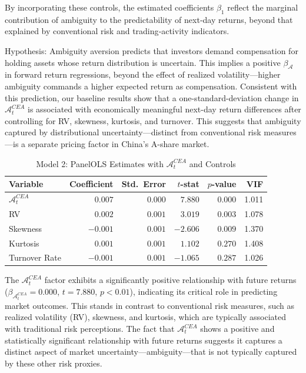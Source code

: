 \documentclass[preprint,12pt,authoryear]{elsarticle}
\renewcommand{\textcolor}[2]{\begingroup\color{#1}#2\endgroup}
\begin{document}
By incorporating these controls, the estimated coefficients \(\beta_1\) reflect the marginal contribution of ambiguity to the predictability of next‐day returns, beyond that explained by conventional risk and trading‐activity indicators.

\textcolor{red}{Hypothesis: Ambiguity aversion predicts that investors demand compensation for holding assets whose return distribution is uncertain. This implies a positive $\beta_{\mathcal{A}}$ in forward return regressions, beyond the effect of realized volatility---higher ambiguity commands a higher expected return as compensation. Consistent with this prediction, our baseline results show that a one-standard-deviation change in $\mathcal{A}^{CEA}_t$ is associated with economically meaningful next-day return differences after controlling for RV, skewness, kurtosis, and turnover. This suggests that ambiguity captured by distributional uncertainty---distinct from conventional risk measures---is a separate pricing factor in China's A-share market.}

\begin{table}[h!]
  \centering
\caption{Model 2: PanelOLS Estimates with \(\mathcal{A}^{CEA}_t\) and Controls}
  \label{tab:panelols_model2}
  \begin{tabularx}{\textwidth}{Xrrrrr}
    \toprule
    Variable         & Coefficient & Std.\ Error & \(t\)-stat & \(p\)-value & VIF    \\
    \midrule
    \(\mathcal{A}^{CEA}_t\) & \(0.007\)   & \(0.000\)   & \(7.880\)   & \(0.000\)   & 1.011  \\
    RV               & \(0.002\)   & \(0.001\)   & \(3.019\)   & \(0.003\)   & 1.078  \\
    Skewness         & \(-0.001\)  & \(0.001\)   & \(-2.606\)  & \(0.009\)   & 1.370  \\
    Kurtosis         & \(0.001\)   & \(0.001\)   & \(1.102\)   & \(0.270\)   & 1.408  \\
    Turnover Rate    & \(-0.001\)  & \(0.001\)   & \(-1.065\)  & \(0.287\)   & 1.026  \\
    \bottomrule
  \end{tabularx}
\end{table}

The $\mathcal{A}^{CEA}_t$ factor exhibits a significantly positive relationship with future returns (\(\beta_{\mathcal{A}^{CEA}_t} = 0.000\), \(t = 7.880\), \(p < 0.01\)), indicating its critical role in predicting market outcomes. This stands in contrast to conventional risk measures, such as realized volatility (RV), skewness, and kurtosis, which are typically associated with traditional risk perceptions. The fact that $\mathcal{A}^{CEA}_t$ shows a positive and statistically significant relationship with future returns suggests it captures a distinct aspect of market uncertainty—ambiguity—that is not typically captured by these other risk proxies.
\end{document}
